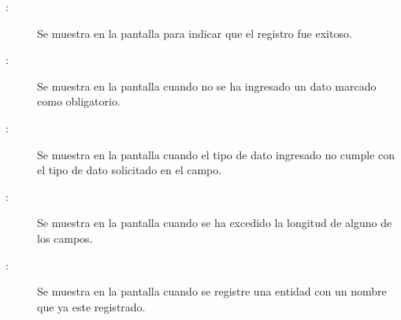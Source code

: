 	
\begin{description}
	\item[:] Se muestra en la pantalla  para indicar que el registro fue exitoso.
	\item[:] Se muestra en la pantalla  cuando no se ha ingresado un dato marcado como obligatorio.
	\item[:] Se muestra en la pantalla  cuando el tipo de dato ingresado no cumple con el tipo de dato solicitado en el campo.
	\item[:] Se muestra en la pantalla  cuando se ha excedido la longitud de alguno de los campos.
	\item[:] Se muestra en la pantalla  cuando se registre una entidad con un nombre que ya este registrado.
\end{description}
